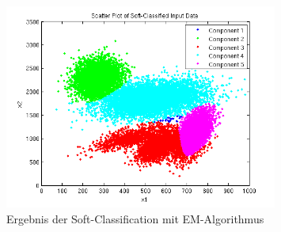 \begin{figure}[h!]
  \centering
	\includegraphics[width=0.8\textwidth]{./figures/6_1_EM_soft_classification.png}
	\caption{Ergebnis der Soft-Classification mit EM-Algorithmus}
	\label{fig:6_1_EM_soft_classification}
\end{figure}
